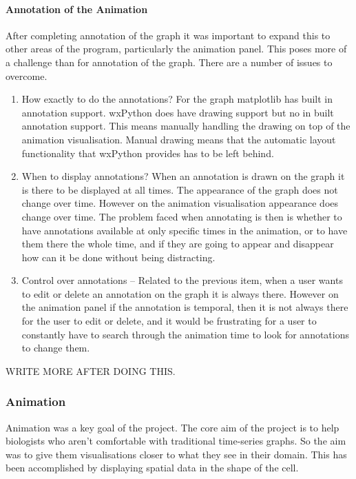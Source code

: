 \paragraph{Annotation of the Animation}

After completing annotation of the graph it was important to expand this to other areas of the program, particularly the animation panel.  This poses more of a challenge than for annotation of the graph.  There are a number of issues to overcome.

\begin{enumerate}
\item How exactly to do the annotations?  For the graph matplotlib has built in annotation support.  wxPython does have drawing support but no in built annotation support.  This means manually handling the drawing on top of the animation visualisation.  Manual drawing means that the automatic layout functionality that wxPython provides has to be left behind.
\item When to display annotations?  When an annotation is drawn on the graph it is there to be displayed at all times.  The appearance of the graph does not change over time.  However on the animation visualisation appearance does change over time.  The problem faced when annotating is then is whether to have annotations available at only specific times in the animation, or to have them there the whole time, and if they are going to appear and disappear how can it be done without being distracting.
\item Control over annotations -- Related to the previous item, when a user wants to edit or delete an annotation on the graph it is always there.  However on the animation panel if the annotation is temporal, then it is not always there for the user to edit or delete, and it would be frustrating for a user to constantly have to search through the animation time to look for annotations to change them.
\end{enumerate}

WRITE MORE AFTER DOING THIS.

\subsubsection{Animation}

Animation was a key goal of the project.  The core aim of the project is to help biologists who aren't comfortable with traditional time-series graphs.  So the aim was to give them visualisations closer to what they see in their domain.  This has been accomplished by displaying spatial data in the shape of the cell.

